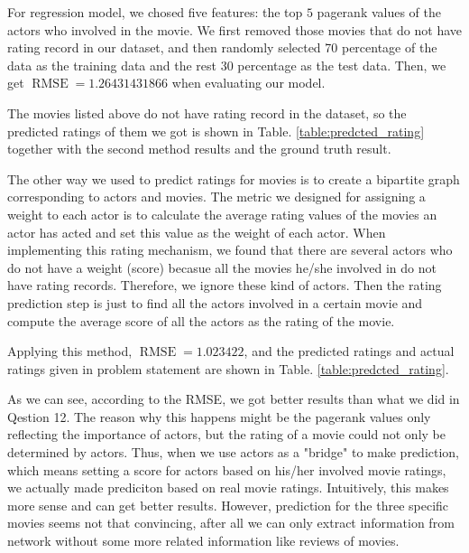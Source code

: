 \documentclass[11pt]{article}
\DeclareMathOperator{\RMSE}{RMSE}
\begin{document}
For regression model, we chosed five features: the top $5$ pagerank values of the actors who involved in the movie. We first removed those movies that do not have rating record in our dataset, and then randomly selected 70 percentage of the data as the training data and the rest 30 percentage as the test data. Then, we get $\RMSE = 1.26431431866$  when evaluating our model.

The movies listed above do not have rating record in the dataset, so the predicted ratings of them we got is shown in Table. \ref{table:predcted_rating} together with the second method results and the ground truth result.

The other way we used to predict ratings for movies is to create a bipartite graph corresponding to actors and movies. The metric we designed for assigning a weight to each actor is to calculate the average rating values of the movies an actor has acted and set this value as the weight of each actor. When implementing this rating mechanism, we found that there are several actors who do not have a weight (score) becasue all the movies he/she involved in do not have rating records. Therefore, we ignore these kind of actors. Then the rating prediction step is just to find all the actors involved in a certain movie and compute the average score of all the actors as the rating of the movie.

Applying this method, $\RMSE=1.023422$, and the predicted ratings and actual ratings given in problem statement are shown in Table. \ref{table:predcted_rating}.

As we can see, according to the RMSE, we got better results than what we did in Qestion 12. The reason why this happens might be the pagerank values only reflecting the importance of actors, but the rating of a movie could not only be determined by actors. Thus, when we use actors as a "bridge" to make prediction, which means setting a score for actors based on his/her involved movie ratings, we actually made prediciton based on real movie ratings. Intuitively, this makes more sense and can get better results. However, prediction for the three specific movies seems not that convincing, after all we can only extract information from network without some more related information like reviews of movies.

\begin{table}[H]
\center
\caption{Average rating vs. actual rating of the three movies, with community considered}
\label{table:predcted_rating}
\end{table}
\end{document}
